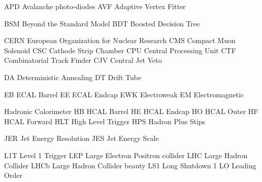 
  {APD}  {Avalanche photo-diodes}
  {AVF}  {Adaptive Vertex Fitter}

 {BSM} {Beyond the Standard Model}
 {BDT} {Boosted Decision Tree}

 {CERN} {European Organization for Nuclear Research} %
  {CMS}  {Compact Muon Solenoid}
  {CSC}  {Cathode Strip Chamber}
  {CPU}  {Central Processing Unit}
  {CTF}  {Combinatorial Track Finder}
  {CJV}  {Central Jet Veto}

 {DA} {Deterministic Annealing}
 {DT} {Drift Tube}

  {EB}  {ECAL Barrel}
  {EE}  {ECAL Endcap}
 {EWK} {Electroweak}
  {EM}  {Electromagnetic}



  {Hadronic Calorimeter}
  {HB}    {HCAL Barrel}
  {HE}    {HCAL Endcap}
  {HO}    {HCAL Outer}
  {HF}    {HCAL Forward}
 {HLT}   {High Level Trigger}
 {HPS}   {Hadron Plus Stips}


 {JER} {Jet Energy Resolution}
 {JES} {Jet Energy Scale}


   {L1T}   {Level 1 Trigger}
   {LEP}   {Large Electron Positron collider}
   {LHC}   {Large Hadron Collider}
  {LHCb}  {Large Hadron Collider beauty}
   {LS1}   {Long Shutdown 1}
    {LO}    {Leading Order}

